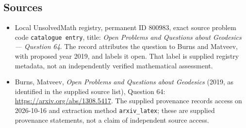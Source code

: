 \documentclass[11pt]{article}
\begin{document}
\subsection{Sources}
\begin{itemize}
\item Local UnsolvedMath registry, permanent ID \(800983\), exact source problem code \texttt{catalogue entry}, title: \emph{Open Problems and Questions about Geodesics --- Question 64}. The record attributes the question to Burns and Matveev, with proposed year 2019, and labels it open. That label is supplied registry metadata, not an independently verified mathematical assessment.
\item Burns, Matveev, \emph{Open Problems and Questions about Geodesics} (2019, as identified in the supplied source list), Question 64: \url{https://arxiv.org/abs/1308.5417}. The supplied provenance records access on 2026-10-16 and extraction method \texttt{arxiv\_latex}; these are supplied provenance statements, not a claim of independent source access.
\end{itemize}
\end{document}
